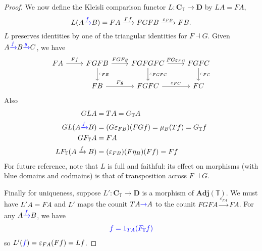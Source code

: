 \documentclass[a4paper]{article}
\renewcommand{\c}[1]{\mathbf{#1}}
\newcommand{\adjoint}{\dashv}
\newcommand{\T}{{\mathbb{T}}} %
\newcommand{\blue}[1]{\textcolor{blue}{#1}}
\begin{document}
\begin{proof}
  We now define the Kleisli comparison functor \(L: \c C _\T \to \c D\) by \(LA = FA\),
  \[
    L(A \blue{\xrightarrow{f}} B) = FA \xrightarrow{Ff} FGFB \xrightarrow{\varepsilon_{FB}} FB.
  \]
  \(L\) preserves identities by one of the triangular identities for \(F \adjoint G\). Given \(A \blue{\xrightarrow{f}} B \blue{\xrightarrow{g}} C\), we have
  \[
    \begin{tikzcd}
      FA \ar[r, "Ff"] & FGFB \ar[r, "FGFg"] \ar[d, "\varepsilon_{FB}"] & FGFGFC \ar[r, "FG\varepsilon_{FC}"] \ar[d, "\varepsilon_{FGFC}"] & FGFC \ar[d, "\varepsilon_{FC}"] \\
      & FB \ar[r, "Fg"] & FGFC \ar[r, "\varepsilon_{FC}"] & FC
    \end{tikzcd}
  \]
  Also
  \begin{align*}
    GLA &= TA = G_\T A \\
    GL(A \blue{\xrightarrow{f}} B) &= (G \varepsilon_{FB}) (FGf) = \mu_B(Tf) = G_\T f \\
    GF_\T A &= FA \\
    LF_\T(A \xrightarrow{f} B) &= (\varepsilon_{FB}) (F\eta_B) (Ff) = Ff
  \end{align*}
  For future reference, note that \(L\) is full and faithful: its effect on morphisms (with blue domains and codmains) is that of transposition across \(F \adjoint G\).

  Finally for uniqueness, suppose \(L': \c C_\T \to \c D\) is a morphism of \(\c{Adj}(\T)\). We must have \(L'A = FA\) and \(L'\) maps the counit \(TA \blue{\to} A\) to the counit \(FGFA \xrightarrow{\varepsilon_{FA}} FA\). For any \(A \blue{\xrightarrow{f}} B\), we have
  \begin{align*}
    \blue{f = 1_{TA}(F_\T f)}
  \end{align*}
  so \(L'(\blue{f}) = \varepsilon_{FA} (Ff) = Lf\).
\end{proof}


\printindex
\end{document}

